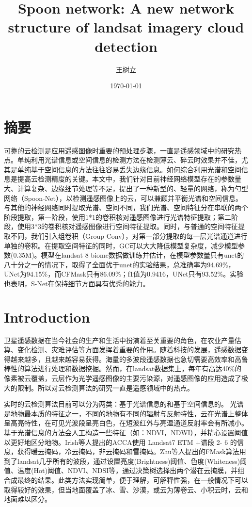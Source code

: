 \documentclass[UTF8]{ctexart}
\begin{document}
\title{Spoon network: A new network structure of landsat imagery cloud detection}
\author{王树立}
\date{\today}

\maketitle
\section*{摘要}
可靠的云检测是应用遥感图像时重要的预处理步骤，一直是遥感领域中的研究热点。单纯利用光谱信息或空间信息的检测方法在检测薄云、碎云时效果并不佳，尤其是单纯基于空间信息的方法往往容易丢失边缘信息。如何综合利用光谱和空间信息是提高云检测精度的关键。本文中，我们针对目前神经网络模型存在的参数量大、计算复杂、边缘细节处理等不足，提出了一种新型的、轻量的网络，称为勺型网络（Spoon-Net），以检测遥感图像上的云，可以兼顾并平衡光谱和空间信息。与其他的神经网络同时提取光谱、空间不同，我们光谱、空间特征分在串联的两个阶段提取，第一阶段，使用1*1的卷积核对遥感图像进行光谱特征提取；第二阶段，使用3*3的卷积核对遥感图像进行空间特征提取。同时，与普通的空间特征提取不同，我们引入组卷积（Group Conv），对第一部分提取的每一层光谱通道进行单独的卷积。在提取空间特征的同时，GC可以大大降低模型复杂度，减少模型参数(0.35M)。模型在landsat 8 biome数据做训练并估计，在模型参数量只有unet的八十分之一的情况下，取得了全面优于unet的实验结果，总准确率为94.69\%，UNet为94.15\%，而CFMask只有86.09\%；f1值为0.9416，UNet只有93.52\%。实验也表明，S-Net在保持细节方面具有优秀的能力。


\section[]{Introduction}
卫星遥感数据在当今社会的生产和生活中扮演着至关重要的角色，在农业产量估算\cite{prasad2006crop}、变化检测\cite{verbesselt2010detecting}、灾难评估\cite{joyce2009review}等方面发挥着重要的作用。随着科技的发展，遥感数据变得越来越多，且越来越容易获得。海量的多波段遥感数据也急切需要高效率和高鲁棒性的算法进行处理和数据挖掘。然而，在landsat数据集上，每年有高达40\%的像素被云覆盖\cite{ju2008availability}，云层作为光学遥感图像的主要污染源，对遥感图像的应用造成了极大的限制。所以对云检测算法的研究一直是遥感领域中的热点。

实时的云检测算法目前可以分为两类：基于光谱信息的和基于空间信息的。
光谱是地物最本质的特征之一，不同的地物有不同的辐射与反射特性，云在光谱上整体呈高亮特性，在可见光波段呈亮白色，在短波红外与亮温通道反射率会有所减小。基于光谱信息的方法\cite{sun2018cloud}会人工构造一些特征（如：NDVI，NDWI），并精心设置阈值以更好地区分地物。Irish等人\cite{irish2006characterization}提出的ACCA使用 Landsat7 ETM +谱段 2- 6 的信息，获得暖云掩码，冷云掩码，非云掩码和雪掩码。Zhu等人提出的FMask算法\cite{zhu2012object}用到了landsat几乎所有的波段，通过设置亮度(Brightness)阈值、色度(Whiteness)阈值、温度(Hot)阈值、NDVI、NDSI等，通过决策树选择出两个潜在云掩膜，并组合成最终的结果。此类方法实现简单，便于理解，可解释性强，在一般情况下可以取得较好的效果，但当地面覆盖了冰、雪、沙漠，或云为薄卷云、小积云时，云和地面难以区分。
\end{document}
